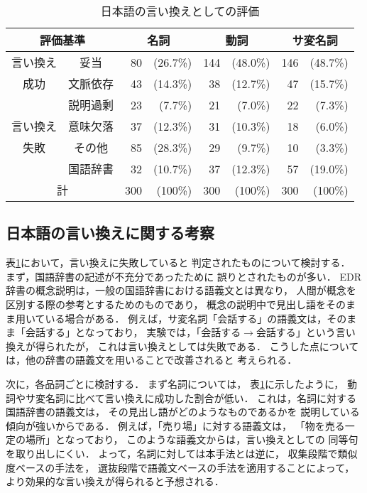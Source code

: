    \begin{table}[tb]
	\caption{\label{jpresult2}日本語の言い換えとしての評価}
	\begin{center}
	 \begin{tabular}{c|c|rr|rr|rr}\hline
	  \multicolumn{2}{c|}{評価基準} &  \multicolumn{2}{c|}{名詞} & \multicolumn{2}{c|}{動詞} & \multicolumn{2}{c}{サ変名詞} \\ \hline 
	  言い換え & 妥当 &  80 & (26.7\%)& 144 &(48.0\%)& 146 &(48.7\%)\\ 
	  成功     & 文脈依存 &  43 &(14.3\%)&  38 &(12.7\%)&  47 &(15.7\%)\\ \hline 
	           & 説明過剰 &  23 &(7.7\%)&  21 &(7.0\%)&  22 &(7.3\%)\\ 
	  言い換え & 意味欠落 &  37 &(12.3\%)&  31 &(10.3\%)&  18 &(6.0\%)\\ 
	  失敗     & その他   &  85 &(28.3\%)&  29 &(9.7\%)&  10 &(3.3\%)\\ 
	           & 国語辞書 &  32 &(10.7\%)&  37 &(12.3\%)&  57 &(19.0\%)\\ \hline 
			 \multicolumn{2}{c|}{計} & 300 &(100\%)& 300&(100\%) & 300&(100\%) \\ \hline
	 \end{tabular}
	\end{center}
   \end{table}   

   \subsection{日本語の言い換えに関する考察}
表\ref{jpresult2}において，言い換えに失敗していると
判定されたものについて検討する．
まず，国語辞書の記述が不充分であったために
誤りとされたものが多い．
EDR辞書の概念説明は，一般の国語辞書における語義文とは異なり，
人間が概念を区別する際の参考とするためのものであり，
概念の説明中で見出し語をそのまま用いている場合がある．
例えば，サ変名詞「会話する」の語義文は，そのまま「会話する」となっており，
実験では，「会話する$\rightarrow$会話する」という言い換えが得られたが，
これは言い換えとしては失敗である．
こうした点については，他の辞書の語義文を用いることで改善されると
考えられる．
  
次に，各品詞ごとに検討する．
まず名詞については，
  表\ref{jpresult2}に示したように，
  動詞やサ変名詞に比べて言い換えに成功した割合が低い．
  これは，名詞に対する国語辞書の語義文は，
その見出し語がどのようなものであるかを
説明している傾向が強いからである．
例えば，「売り場」に対する語義文は，
「物を売る一定の場所」となっており，
このような語義文からは，言い換えとしての
同等句を取り出しにくい．
よって，名詞に対しては本手法とは逆に，
収集段階で類似度ベースの手法を，
選抜段階で語義文ベースの手法を適用することによって，
より効果的な言い換えが得られると予想される．
  
